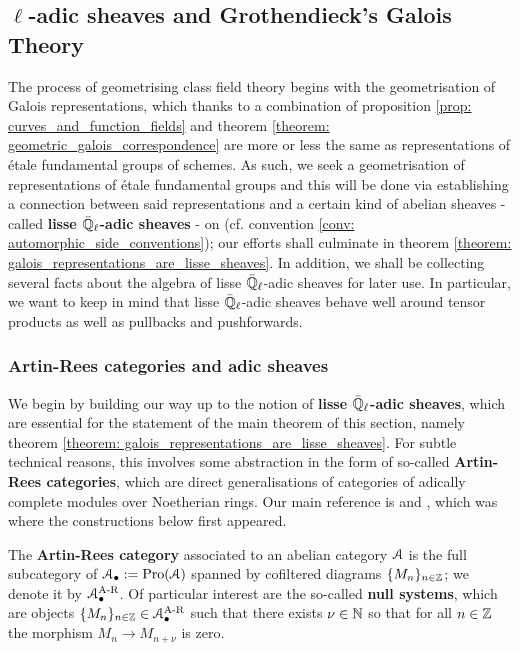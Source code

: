         \subsection{\texorpdfstring{$\ell$}{}-adic sheaves and Grothendieck's Galois Theory}
            The process of geometrising class field theory begins with the geometrisation of Galois representations, which thanks to a combination of proposition \ref{prop: curves_and_function_fields} and theorem \ref{theorem: geometric_galois_correspondence} are more or less the same as representations of \'etale fundamental groups of schemes. As such, we seek a geometrisation of representations of \'etale fundamental groups and this will be done via establishing a connection between said representations and a certain kind of abelian sheaves - called \textbf{lisse $\bar{\mathbb{Q}}_{\ell}$-adic sheaves} - on  (cf. convention \ref{conv: automorphic_side_conventions}); our efforts shall culminate in theorem \ref{theorem: galois_representations_are_lisse_sheaves}. In addition, we shall be collecting several facts about the algebra of lisse $\bar{\mathbb{Q}}_{\ell}$-adic sheaves for later use. In particular, we want to keep in mind that lisse $\bar{\mathbb{Q}}_{\ell}$-adic sheaves behave well around tensor products as well as pullbacks and pushforwards.  
        
            \subsubsection{Artin-Rees categories and adic sheaves}
                We begin by building our way up to the notion of \textbf{lisse $\bar{\mathbb{Q}}_{\ell}$-adic sheaves}, which are essential for the statement of the main theorem of this section, namely theorem \ref{theorem: galois_representations_are_lisse_sheaves}. For subtle technical reasons, this involves some abstraction in the form of so-called \textbf{Artin-Rees categories}, which are direct generalisations of categories of adically complete modules over Noetherian rings. Our main reference is \cite[Subsection 1.4]{conrad_etale_cohomology} and \cite[Expos\'e V]{sga5}, which was where the constructions below first appeared.
            
                \begin{definition} \label{def: artin_rees_categories}
                    The \textbf{Artin-Rees category} associated to an abelian category $\mathcal{A}$ is the full subcategory of $\mathcal{A}_{\bullet} := \mathrm{Pro}(\mathcal{A})$ spanned by cofiltered diagrams $\{M_n\}_{n \in \mathbb{Z}}$; we denote it by $\mathcal{A}_{\bullet}^{\mathrm{A\text{-}R}}$. Of particular interest are the so-called \textbf{null systems}, which are objects $\{M_n\}_{n \in \mathbb{Z}} \in \mathcal{A}_{\bullet}^{\mathrm{A\text{-}R}}$ such that there exists $\nu \in \mathbb{N}$ so that for all $n \in \mathbb{Z}$ the morphism $M_n \to M_{n + \nu}$ is zero.
                \end{definition}
                
